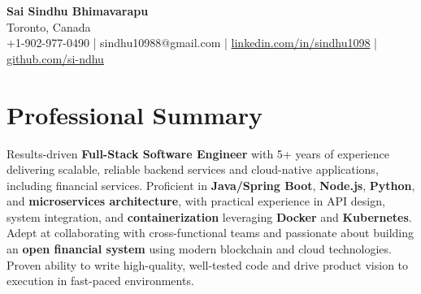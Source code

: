 \documentclass[letterpaper,11pt]{article}
\begin{document}
\begin{center}
  {\Large \textbf{Sai Sindhu Bhimavarapu}} \\
  Toronto, Canada \\
  +1-902-977-0490 \enspace | \enspace sindhu10988@gmail.com \enspace | \enspace \href{https://www.linkedin.com/in/sindhu1098/}{linkedin.com/in/sindhu1098} \enspace | \enspace \href{https://github.com/si-ndhu}{github.com/si-ndhu}
\end{center}

\section{Professional Summary}
  \begin{itemize}[leftmargin=0.15in, label={}]
    \small{\item{
     Results-driven \textbf{Full-Stack Software Engineer} with 5+ years of experience delivering scalable, reliable backend services and cloud-native applications, including financial services. Proficient in \textbf{Java/Spring Boot}, \textbf{Node.js}, \textbf{Python}, and \textbf{microservices architecture}, with practical experience in API design, system integration, and \textbf{containerization} leveraging \textbf{Docker} and \textbf{Kubernetes}. Adept at collaborating with cross-functional teams and passionate about building an \textbf{open financial system} using modern blockchain and cloud technologies. Proven ability to write high-quality, well-tested code and drive product vision to execution in fast-paced environments.
    }}
  \end{itemize}
\vspace{-16pt}

\end{document}
